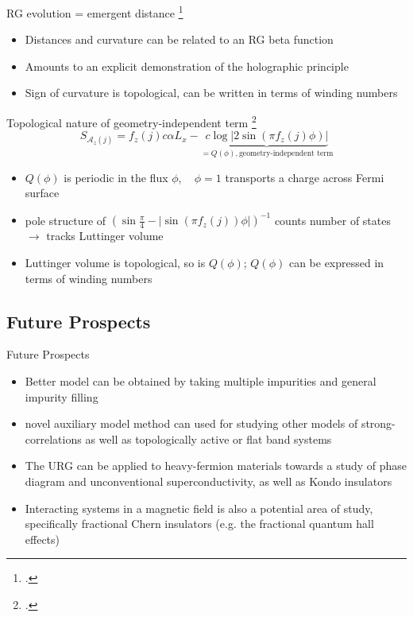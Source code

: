 \documentclass[8pt,aspectratio=169]{beamer}
\newcommand{\nitem}{\item[\ding{51}]}
\begin{document}
\begin{frame}{RG evolution = emergent distance}
	\footcite{maldacena1999large,ryu2006aspects,holzhey_1994}
\begin{itemize}
	\nitem Distances and curvature can be related to an RG \alert{beta function}\\[10pt]
	\nitem Amounts to an \alert{explicit demonstration} of the holographic principle\\[10pt]
	\nitem Sign of curvature is \alert{topological}, can be written in terms of winding numbers\\[10pt]
\end{itemize}
	
\end{frame}

\begin{frame}{Topological nature of geometry-independent term}
	\footcite{luttinger1960ground,luttinger1960fermi,oshikawa2000topological,seki2017topological,anirbanurg1,Heath_2020}
	\[S_{\mathcal{A}_z(j)} = f_z(j) c \alpha L_x - \underbrace{c \log \big|2\sin\left(\pi f_z(j)\phi\right)\big|}_{=Q(\phi),\text{geometry-independent term}}\]
	\begin{itemize}
	\nitem \(Q(\phi)\) is periodic in the flux \(\phi\), ~ \(\phi=1\) transports a charge across Fermi surface\\[10pt]
	\nitem pole structure of \(\left(\sin \frac{\pi}{4} - |\sin\left(\pi f_z(j)\right)\phi|\right)^{-1}\) counts number of states \(\longrightarrow\) tracks Luttinger volume\\[10pt]
	\nitem Luttinger volume is topological, so is \(Q(\phi)\); \(Q(\phi)\) can be expressed in terms of winding numbers
	\end{itemize}
	
\end{frame}

\begin{frame}{}
\section{Future Prospects}
\end{frame}

\begin{frame}{Future Prospects}
\begin{itemize}
	\nitem Better model can be obtained by taking multiple impurities and general impurity filling\\[20pt]
\nitem novel auxiliary model method can used for studying other models of strong-correlations as well as topologically active or flat band systems\\[20pt]
\nitem The URG can be applied to heavy-fermion materials towards a study of phase diagram and unconventional superconductivity, as well as Kondo insulators\\[20pt]
\nitem Interacting systems in a magnetic field is also a potential area of study, specifically fractional Chern insulators (e.g. the fractional quantum hall effects)
\end{itemize}
\end{frame}
\end{document}
